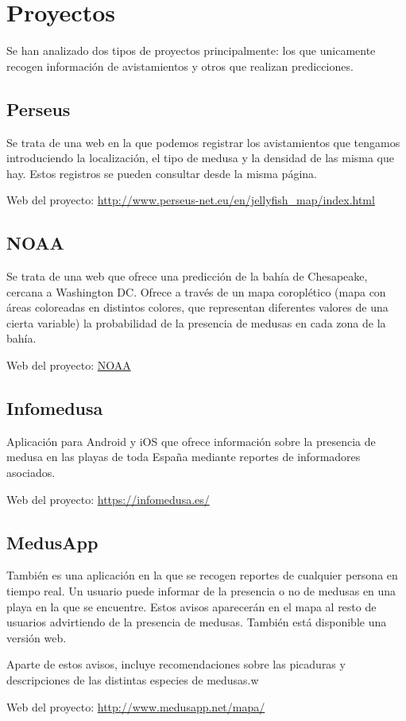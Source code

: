 \section{Proyectos}

Se han analizado dos tipos de proyectos principalmente: los que unicamente recogen información de avistamientos y otros que realizan predicciones.

\subsection{Perseus}

Se trata de una web en la que podemos registrar los avistamientos que tengamos introduciendo la localización, el tipo de medusa y la densidad de las misma que hay.
Estos registros se pueden consultar desde la misma página.

Web del proyecto: \href{http://www.perseus-net.eu/en/jellyfish_map/index.html}{http://www.perseus-net.eu/en/jellyfish\_map/index.html}

\subsection{NOAA}

Se trata de una web que ofrece una predicción de la bahía de Chesapeake, cercana a Washington DC. Ofrece a través de un mapa coroplético (mapa con áreas coloreadas en distintos colores, que representan diferentes valores de una cierta variable) la probabilidad de la presencia de medusas en cada zona de la bahía.

Web del proyecto: \href{https://ocean.weather.gov/Loops/ocean_guidance.php?model=Sea_Nettles&area=Prob&plot=prob&day=0&loop=1}{NOAA}

\subsection{Infomedusa}

Aplicación para Android y iOS que ofrece información sobre la presencia de medusa en las playas de toda España mediante reportes de informadores asociados.

Web del proyecto: \href{https://infomedusa.es/}{https://infomedusa.es/}

\subsection{MedusApp}

También es una aplicación en la que se recogen reportes de cualquier persona en tiempo real. Un usuario puede informar de la presencia o no de medusas en una playa en la que se encuentre. Estos avisos aparecerán en el mapa al resto de usuarios advirtiendo de la presencia de medusas. También está disponible una versión web.

Aparte de estos avisos, incluye recomendaciones sobre las picaduras y descripciones de las distintas especies de medusas.w

Web del proyecto: \url{http://www.medusapp.net/mapa/}
